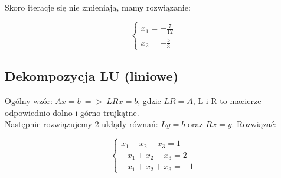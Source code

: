 \documentclass{article}
\begin{document}
Skoro iteracje się nie zmieniają, mamy rozwiązanie:

\begin{equation*}\begin{cases}
    x_1=-\frac{7}{12}\\
    x_2=-\frac{5}{3}
\end{cases}\end{equation*}

\subsection{Dekompozycja LU (liniowe)}
Ogólny wzór: $Ax=b\:=>\:LRx=b$, gdzie $LR=A$, L i R to macierze odpowiednio dolno i górno trujkątne.\\
Następnie rozwiązujemy 2 ukłądy równań: $Ly=b$ oraz $Rx=y$.
Rozwiązać:

\begin{equation*}\begin{cases}
    x_1-x_2-x_3=1\\
    -x_1+x_2-x_3=2\\
    -x_1+x_2+x_3=-1
\end{cases}\end{equation*}
\end{document}
